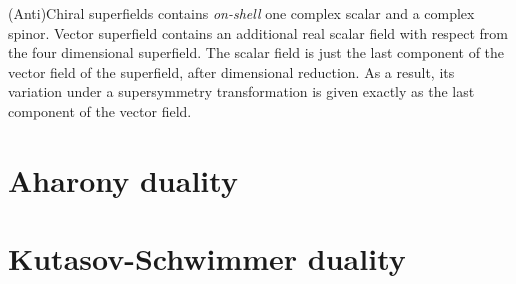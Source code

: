 (Anti)Chiral superfields contains \emph{on-shell} one complex scalar and a complex spinor.
Vector superfield contains an additional real scalar field with respect from the four dimensional superfield.
The scalar field is just the last component of the vector field of the superfield, after dimensional reduction. 
As a result, its variation under a supersymmetry transformation is given exactly as the last component of the vector field.

















\section{Aharony duality}
\section{Kutasov-Schwimmer duality}
